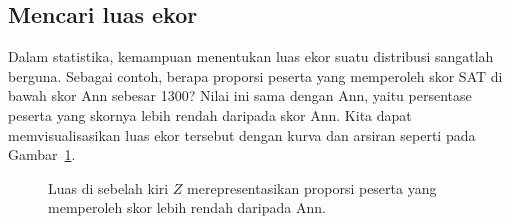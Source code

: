 \subsection{Mencari luas ekor}

Dalam statistika, kemampuan menentukan luas ekor suatu distribusi
sangatlah berguna.
Sebagai contoh, berapa proporsi peserta yang memperoleh skor SAT
di bawah skor Ann sebesar 1300?
Nilai ini sama dengan  Ann, yaitu
persentase peserta yang skornya lebih rendah daripada skor Ann.
Kita dapat memvisualisasikan luas ekor tersebut dengan kurva dan
arsiran seperti pada Gambar~\ref{satBelow1300}.

\begin{figure}[h]
  \centering
  \caption{Luas di sebelah kiri $Z$ merepresentasikan proporsi peserta
      yang memperoleh skor lebih rendah daripada Ann.}
  \label{satBelow1300}
\end{figure}

